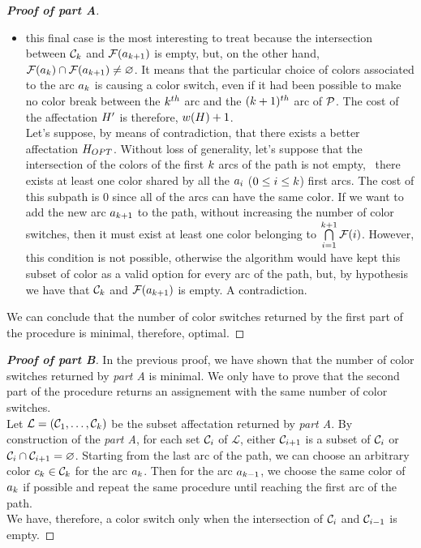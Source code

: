 \begin{proof}[\normalfont\textbf{Proof of \textit{part A}}]
\begin{itemize}
\begin{itemize}
			      \item this final case is the most interesting to treat because the intersection between $\mathcal{C}_{k}$ and $\mathcal{F}(a_{k+1})$ is empty, but, on the other hand, $\mathcal{F}(a_{k}) \cap \mathcal{F}(a_{k+1}) \neq \varnothing$. It means that the particular choice of colors associated to the arc $a_k$ is causing a color switch, even if it had been possible to make no color break between the $k^{th}$ arc and the  $(k+1)^{th}$ arc of $\mathcal{P}$. The cost of the affectation $H'$ is therefore, $w(H) + 1$.\\
			            Let's suppose, by means of contradiction, that there exists a better affectation $H_{OPT}$. Without loss of generality, let's suppose that the intersection of the colors of the first $k$ arcs of the path is not empty, \ie\ there exists at least one color shared by all the $a_i$ ($0 \leq i \leq k$) first arcs. The cost of this subpath is $0$ since all of the arcs can have the same color. If we want to add the new arc $a_{k + 1}$ to the path, without increasing the number of color switches, then it must exist at least one color belonging to $\bigcap\limits_{i = 1}^{k + 1} \mathcal{F}(i)$. However, this condition is not possible, otherwise the algorithm would have kept this subset of color as a valid option for every arc of the path, but, by hypothesis we have that $\mathcal{C}_k$ and $\mathcal{F}(a_{k + 1})$ is empty. A contradiction.
		      \end{itemize}
	\end{itemize}
	We can conclude that the number of color switches returned by the first part of the procedure is minimal, therefore, optimal.
\end{proof}

\begin{proof}[\normalfont\textbf{Proof of \textit{part B}}]
	In the previous proof, we have shown that the number of color switches returned by \textit{part A} is minimal. We only have to prove that the second part of the procedure returns an assignement with the same number of color switches.\\
	Let $\mathcal{L} = (\mathcal{C}_1,\ldots,\mathcal{C}_{k})$ be the subset affectation returned by \textit{part A}. By construction of the \textit{part A}, for each set $\mathcal{C}_i$ of $\mathcal{L}$, either $\mathcal{C}_{i+1}$ is a subset of $\mathcal{C}_i$ or $\mathcal{C}_i \cap \mathcal{C}_{i+1} = \varnothing$.
	Starting from the last arc of the path, we can choose an arbitrary color $c_k \in \mathcal{C}_k$ for the arc $a_k$. Then for the arc $a_{k-1}$, we choose the same color of $a_k$ if possible and repeat the same procedure until reaching the first arc of the path.\\
	We have, therefore, a color switch only when the intersection of $\mathcal{C}_i$ and $\mathcal{C}_{i-1}$ is empty.
\end{proof}

